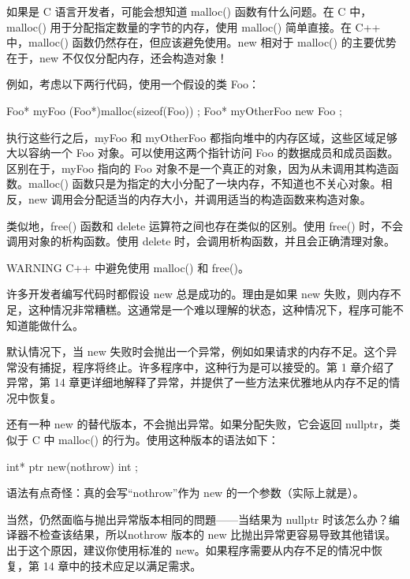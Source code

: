 如果是 C 语言开发者，可能会想知道 malloc() 函数有什么问题。在 C 中，malloc() 用于分配指定数量的字节的内存，使用 malloc() 简单直接。在 C++ 中，malloc() 函数仍然存在，但应该避免使用。new 相对于 malloc() 的主要优势在于，new 不仅仅分配内存，还会构造对象！

例如，考虑以下两行代码，使用一个假设的类 Foo：

\begin{cpp}
Foo* myFoo { (Foo*)malloc(sizeof(Foo)) };
Foo* myOtherFoo { new Foo{} };
\end{cpp}

执行这些行之后，myFoo 和 myOtherFoo 都指向堆中的内存区域，这些区域足够大以容纳一个 Foo 对象。可以使用这两个指针访问 Foo 的数据成员和成员函数。区别在于，myFoo 指向的 Foo 对象不是一个真正的对象，因为从未调用其构造函数。malloc() 函数只是为指定的大小分配了一块内存，不知道也不关心对象。相反，new 调用会分配适当的内存大小，并调用适当的构造函数来构造对象。

类似地，free() 函数和 delete 运算符之间也存在类似的区别。使用 free() 时，不会调用对象的析构函数。使用 delete 时，会调用析构函数，并且会正确清理对象。

\begin{myWarning}{WARNING}
C++ 中避免使用 malloc() 和 free()。
\end{myWarning}


许多开发者编写代码时都假设 new 总是成功的。理由是如果 new 失败，则内存不足，这种情况非常糟糕。这通常是一个难以理解的状态，这种情况下，程序可能不知道能做什么。

默认情况下，当 new 失败时会抛出一个异常，例如如果请求的内存不足。这个异常没有捕捉，程序将终止。许多程序中，这种行为是可以接受的。第 1 章介绍了异常，第 14 章更详细地解释了异常，并提供了一些方法来优雅地从内存不足的情况中恢复。

还有一种 new 的替代版本，不会抛出异常。如果分配失败，它会返回 nullptr，类似于 C 中 malloc() 的行为。使用这种版本的语法如下：

\begin{cpp}
int* ptr { new(nothrow) int };
\end{cpp}

语法有点奇怪：真的会写“nothrow”作为 new 的一个参数（实际上就是）。

当然，仍然面临与抛出异常版本相同的問題——当结果为 nullptr 时该怎么办？编译器不检查该结果，所以nothrow 版本的 new 比抛出异常更容易导致其他错误。出于这个原因，建议你使用标准的 new。如果程序需要从内存不足的情况中恢复，第 14 章中的技术应足以满足需求。

